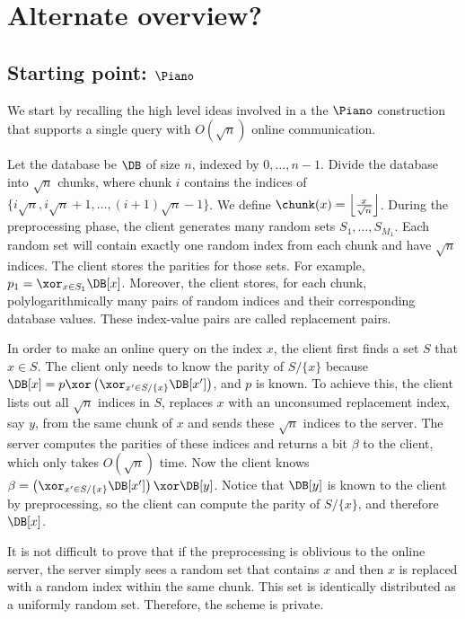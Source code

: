 \section{Alternate overview?}

\subsection{Starting point: $\Piano$~\cite{piano}} 
We start by recalling the
high level ideas involved in a the $\Piano$ construction that supports a single
query with $O(\sqrt{n})$ online communication.

Let the database be $\DB$  of size $n$, indexed by $0,\ldots,n-1$. Divide the
database into $\sqrt{n}$ chunks, where chunk $i$ contains the indices of
$\{i\sqrt{n},i\sqrt{n}+1,\dots,(i+1)\sqrt{n}-1\}$. We define
$\chunk(x)=\left\lfloor \frac{x}{\sqrt{n}}\right\rfloor$. During the
preprocessing phase, the client generates many random sets $S_1,\dots,S_{M_1}$.
Each random set will contain exactly one random index from each chunk and have
$\sqrt{n}$ indices. The client stores the parities for those sets. For example,
$p_1=\xor_{x\in S_1}\DB[x]$. Moreover, the client stores, for each chunk,
polylogarithmically many pairs of random indices and their corresponding
database values. These index-value pairs are called replacement pairs.

In order to make an online query on the index $x$, the client first finds a set
$S$ that $x\in S$. The client only needs to know the parity of $S/\{x\}$
because $\DB[x]=p \xor\left(\xor_{x'\in S/\{x\}}\DB[x']\right)$, and $p$
is known. To achieve this, the client lists out all $\sqrt{n}$ indices in $S$,
replaces $x$ with an unconsumed replacement index, say $y$, from the same chunk
of $x$ and sends these $\sqrt{n}$ indices to the server. The server computes the
parities of these indices and returns a bit $\beta$ to the client, which only
takes $O(\sqrt{n})$ time. Now the client knows $\beta=\left(\xor_{x'\in
S/\{x\}}\DB[x']\right)\xor \DB[y]$. Notice that $\DB[y]$ is known to the
client by preprocessing, so the client can compute the parity of $S/\{x\}$,
and therefore $\DB[x]$.

It is not difficult to prove that if the preprocessing is oblivious to the online server, the
server simply sees a random set that contains $x$ and then $x$ is replaced with
a random index within the same chunk. This set is identically distributed as a
uniformly random set. %
Therefore, the scheme is private.

